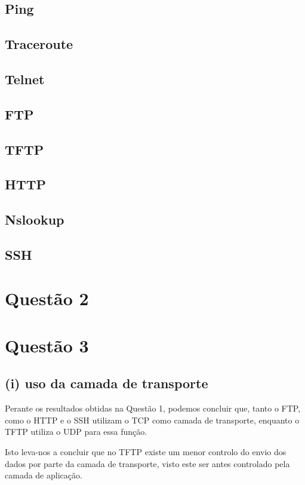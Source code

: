 \documentclass{llncs}
\begin{document}
\subsection{Ping}

\subsection{Traceroute}

\subsection{Telnet}

\subsection{FTP}

\subsection{TFTP}

\subsection{HTTP}

\subsection{Nslookup}

\subsection{SSH}


\section{Questão 2}

\section{Questão 3}
\subsection{(i) uso da camada de transporte}
Perante os resultados obtidas na Questão 1, podemos concluir que, tanto o FTP, como o HTTP e o SSH utilizam o TCP como camada de transporte, enquanto o TFTP utiliza o UDP para essa função.

Isto leva-nos a concluir que no TFTP existe um menor controlo do envio dos dados por parte da camada de transporte, visto este ser antes controlado pela camada de aplicação.
\end{document}
